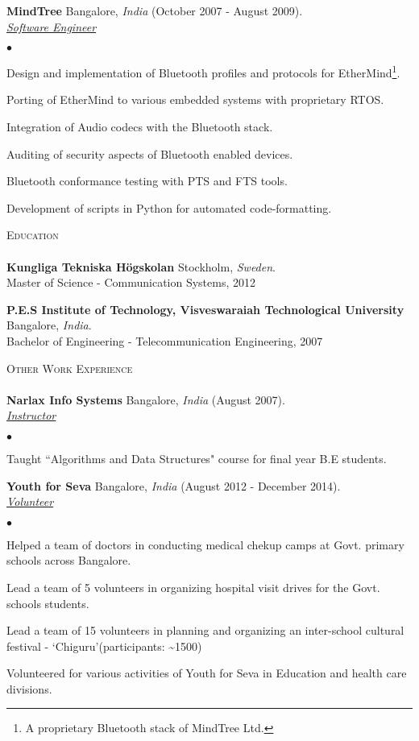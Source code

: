 \documentclass[a4paper]{article}
\newcommand{\lineunder}{\vspace*{-8pt} \\ \hspace*{-18pt} \hrulefill \\}
\newcommand{\header}[1]{{\hspace*{-15pt}\vspace*{6pt} \textsc{#1}} \vspace*{-6pt} \lineunder}
\newcommand{\employer}[4]{{ \textbf{#1} #2  (#3).\\ \underline{\emph{#4}}\\  }}
\newenvironment{achievements}{\begin{list}{$\bullet$}{\topsep 0pt \itemsep -2pt}}{\vspace*{4pt}\end{list}}
\newcommand{\school}[3]{
 \textbf{#1} #2 \\\vspace*{3pt} #3\\
\vspace*{5pt}
}
\begin{document}
\employer{MindTree} {Bangalore, \textit{India}}{October 2007 - August 2009} {Software Engineer}
	\begin{achievements}
	\item Design and implementation of Bluetooth profiles and protocols for EtherMind\footnote[2]{A proprietary Bluetooth stack of MindTree Ltd.}.
	\item Porting of EtherMind to various embedded systems with proprietary RTOS.
	\item Integration of Audio codecs with the Bluetooth stack.
	\item Auditing of security aspects of Bluetooth enabled devices.
	\item Bluetooth conformance testing with PTS and FTS tools.
	\item Development of scripts in Python for automated code-formatting.
	\end{achievements}

\header{Education}

\school{Kungliga Tekniska H\"{o}gskolan}{Stockholm, \textit{Sweden}.}
{Master of Science - Communication Systems, 2012}

\school{P.E.S Institute of Technology, Visveswaraiah Technological University}{Bangalore, \textit{India}.}{Bachelor of Engineering - Telecommunication Engineering, 2007}

\break
\header{Other Work Experience}
\employer{Narlax Info Systems} {Bangalore, \textit{India}}{August 2007}{Instructor}
	\begin{achievements}
	\item Taught ``Algorithms and Data Structures" course for final year B.E students.
	\end{achievements}

\employer{Youth for Seva}{Bangalore, \textit{India}}{August 2012 - December 2014}{Volunteer}
\begin{achievements}
\item Helped a team of doctors in conducting medical chekup camps at Govt. primary schools across Bangalore.
\item Lead a team of 5 volunteers in organizing hospital visit drives for the Govt. schools students.
\item Lead a team of 15 volunteers in planning and organizing an inter-school cultural festival - `Chiguru'(participants: \textasciitilde 1500)
\item Volunteered for various activities of Youth for Seva in Education and health care divisions.
\end{achievements}
\end{document}
